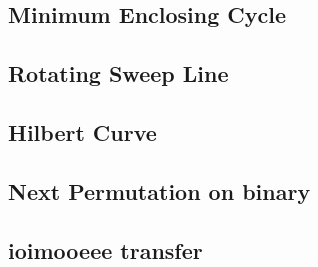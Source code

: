 \documentclass[a4paper,10pt,twocolumn,oneside]{article}
\begin{document}
%

%

\subsection{Minimum Enclosing Cycle}


\subsection{Rotating Sweep Line}


\subsection{Hilbert Curve}


\subsection{Next Permutation on binary}


\subsection{ioimooeee transfer}

\end{document}
